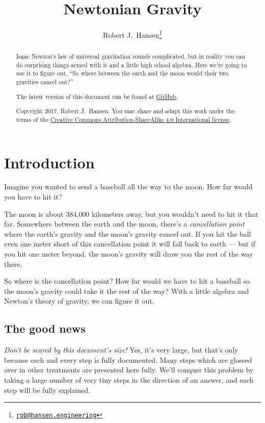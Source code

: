 \documentclass[12pt,letterpaper]{article}
\begin{document}
\title{Newtonian Gravity}
\author{Robert J.\ Hansen\thanks{\href{mailto:rob@hansen.engineering}{\nolinkurl{rob@hansen.engineering}}}}
\maketitle
\begin{abstract}

  Isaac Newton's law of universal gravitation sounds complicated, but in
  reality you can do surprising things armed with it and a little high
  school algebra.  Here we're going to use it to figure out, ``So
  where between the earth and the moon would their two gravities
  cancel out?''

  The latest version of this document can be found at
  \href{https://www.github.com/rjhansen/fun-math}{GitHub}.

  Copyright 2017, Robert J.\ Hansen.  You may share and adapt this
  work under the terms of the
  \href{https://creativecommons.org/licenses/by-sa/4.0/}{Creative
    Commons Attribution-ShareAlike 4.0 International license}.
  
\end{abstract}
\tableofcontents
\section{Introduction}
Imagine you wanted to send a baseball all the way to the moon.  How
far would you have to hit it?

The moon is about 384,000 kilometers away, but you wouldn't need to
hit it that far.  Somewhere between the earth and the moon, there's a
\textit{cancellation point} where the earth's gravity and the moon's
gravity cancel out.  If you hit the ball even one meter short of this
cancellation point it will fall back to earth --- but if you hit one
meter beyond, the moon's gravity will draw you the rest of the way
there.

So where is the cancellation point?  How far would we have to hit a
baseball so the moon's gravity could take it the rest of the way?
With a little algebra and Newton's theory of gravity, we can figure it
out.

\subsection{The good news}
\textit{Don't be scared by this document's size!}  Yes, it's very
large, but that's only because each and every step is fully
documented.  Many steps which are glossed over in other treatments are
presented here fully.  We'll conquer this problem by taking a large
number of very tiny steps in the direction of an answer, and each step
will be fully explained.
\end{document}
